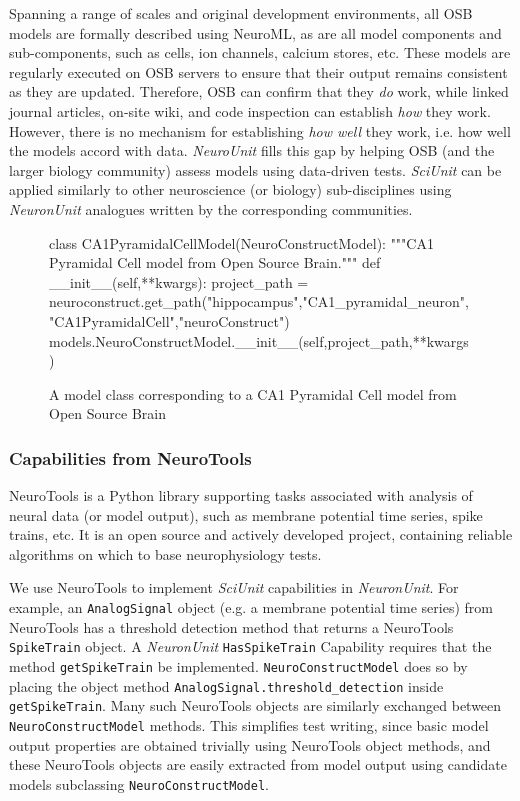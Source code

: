 \documentclass[11pt,letterpaper]{article}
\let\verbx\lstinline
\begin{document}
Spanning a range of scales and original development environments, all OSB models are formally described using NeuroML, as are all model components and sub-components, such as cells, ion channels, calcium stores, etc. 
These models are regularly executed on OSB servers to ensure that their output remains consistent as they are updated. 
Therefore, OSB can confirm that they \textit{do} work, while linked journal articles, on-site wiki, and code inspection can establish \textit{how} they work. 
However, there is no mechanism for establishing \textit{how well} they work, i.e. how well the models accord with data. 
\textit{NeuroUnit} fills this gap by helping OSB (and the larger biology community) assess models using data-driven tests. 
\textit{SciUnit} can be applied similarly to other neuroscience (or biology) sub-disciplines using \textit{NeuronUnit} analogues written by the corresponding communities.    

\begin{figure}
\begin{python}
class CA1PyramidalCellModel(NeuroConstructModel):
	"""CA1 Pyramidal Cell model from Open Source Brain."""
	def __init__(self,**kwargs):
		project_path = neuroconstruct.get_path("hippocampus","CA1_pyramidal_neuron","CA1PyramidalCell","neuroConstruct")
		models.NeuroConstructModel.__init__(self,project_path,**kwargs)
\end{python}
\vspace{-5px}
\caption{A model class corresponding to a CA1 Pyramidal Cell model from Open Source Brain}
\label{fig:ca1_model}
\vspace{-15px}
\end{figure}

\subsubsection{Capabilities from NeuroTools}
NeuroTools\cite{neuralensemble_url} is a Python library supporting tasks associated with analysis of neural data (or model output), such as membrane potential time series, spike trains, etc. 
It is an open source and actively developed project, containing reliable algorithms on which to base neurophysiology tests.

We use NeuroTools to implement \textit{SciUnit} capabilities in \textit{NeuronUnit}. 
For example, an \verbx{AnalogSignal} object (e.g. a membrane potential time series) from NeuroTools has a threshold detection method that returns a NeuroTools \verbx{SpikeTrain} object. 
A \textit{NeuronUnit} \verbx{HasSpikeTrain} Capability requires that the method \verbx{getSpikeTrain} be implemented. 
\verbx{NeuroConstructModel} does so by placing the object method \verbx{AnalogSignal.threshold_detection} inside \verbx{getSpikeTrain}. 
Many such NeuroTools objects are similarly exchanged between \verbx{NeuroConstructModel} methods. 
This simplifies test writing, since basic model output properties are obtained trivially using NeuroTools object methods, and these NeuroTools objects are easily extracted from model output using candidate models subclassing \verbx{NeuroConstructModel}.  
\end{document}

